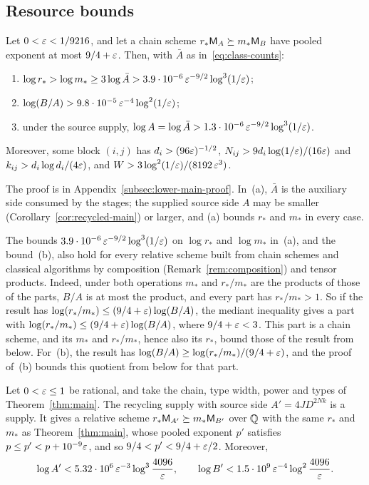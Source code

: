 \subsection{Resource bounds}
\label{subsec:limits-resources}

\begin{theorem}\label{thm:lower}
Let \(0<\varepsilon<1/9216\), and let a chain scheme \(r_*\mathsf M_A\succeq m_*\mathsf M_B\)
have pooled exponent at most \(9/4+\varepsilon\). Then, with \(\bar A\) as
in~\eqref{eq:class-counts}:
\begin{enumerate}
\item[(a)] \(\log r_*>\log m_*\ge3\log\bar A>3.9\cdot10^{-6}\,\varepsilon^{-9/2}\log^3(1/\varepsilon)\);
\item[(b)] \(\log(B/A)>9.8\cdot10^{-5}\,\varepsilon^{-4}\log^2(1/\varepsilon)\);
\item[(c)] under the source supply,
\(\log A=\log\bar A>1.3\cdot10^{-6}\,\varepsilon^{-9/2}\log^3(1/\varepsilon)\).
\end{enumerate}
Moreover, some block \((i,j)\) has \(d_i>(96\varepsilon)^{-1/2}\),
\(N_{ij}>9d_i\log(1/\varepsilon)/(16\varepsilon)\) and
\(k_{ij}>d_i\log d_i/(4\varepsilon)\), and
\(W>3\log^2(1/\varepsilon)/(8192\,\varepsilon^3)\).
\end{theorem}

The proof is in Appendix~\ref{subsec:lower-main-proof}. In~(a),
\(\bar A\) is the auxiliary side consumed by the stages; the supplied
source side \(A\) may be smaller (Corollary~\ref{cor:recycled-main}) or
larger, and (a) bounds \(r_*\) and \(m_*\) in every case.

The bounds \(3.9\cdot10^{-6}\,\varepsilon^{-9/2}\log^3(1/\varepsilon)\) on
\(\log r_*\) and \(\log m_*\) in~(a), and the bound~(b), also hold for
every relative scheme built from chain schemes and classical algorithms
by composition (Remark~\ref{rem:composition}) and tensor products.
Indeed, under both operations \(m_*\) and \(r_*/m_*\) are the products
of those of the parts, \(B/A\) is at most the product, and every part
has \(r_*/m_*>1\). So if the result has
\(\log(r_*/m_*)\le(9/4+\varepsilon)\log(B/A)\), the mediant inequality gives a
part with \(\log(r_*/m_*)\le(9/4+\varepsilon)\log(B/A)\), where
\(9/4+\varepsilon<3\). This part is a chain scheme, and its \(m_*\) and
\(r_*/m_*\), hence also its \(r_*\), bound those of the result from
below. For~(b), the result has
\(\log(B/A)\ge\log(r_*/m_*)/(9/4+\varepsilon)\), and the proof of~(b) bounds
this quotient from below for that part.

\begin{corollary}\label{cor:recycled-main}
Let \(0<\varepsilon\le1\) be rational, and take the chain, type width, power and
types of Theorem~\ref{thm:main}. The recycling supply with source side
\(A'=4JD^{2Nk}\) is a supply. It gives a relative scheme
\(r_*\mathsf M_{A'}\succeq m_*\mathsf M_{B'}\) over \(\mathbb Q\) with the same \(r_*\) and
\(m_*\) as Theorem~\ref{thm:main}, whose pooled exponent \(p'\) satisfies
\(p\le p'<p+10^{-9}\varepsilon\), and so \(9/4<p'<9/4+\varepsilon/2\). Moreover,
\[
 \log A'<5.32\cdot10^6\,\varepsilon^{-3}\log^3\frac{4096}{\varepsilon},\qquad
 \log B'<1.5\cdot10^9\,\varepsilon^{-4}\log^2\frac{4096}{\varepsilon} .
\]
\end{corollary}

